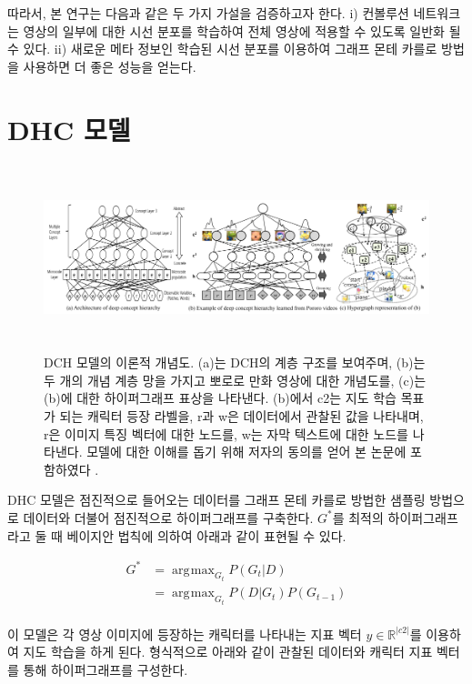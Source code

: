 \documentclass{kcc}
\DeclareMathOperator*{\argmax}{\arg\!\max}
\begin{document}
따라서, 본 연구는 다음과 같은 두 가지 가설을 검증하고자 한다. i) 컨볼루션 네트워크는 영상의 일부에 대한 시선 분포를 학습하여 전체 영상에 적용할 수 있도록 일반화 될 수 있다. ii) 새로운 메타 정보인 학습된 시선 분포를 이용하여 그래프 몬테 카를로 방법을 사용하면 더 좋은 성능을 얻는다.

\section{DHC 모델}

\begin{figure}
  \centerline{\includegraphics[width=180mm,height=54mm]{eps/ha2015_fig2.png}}
  \caption{DCH 모델의 이론적 개념도. (a)는 DCH의 계층 구조를 보여주며, (b)는 두 개의 개념 계층 망을 가지고 뽀로로 만화 영상에 대한 개념도를, (c)는 (b)에 대한 하이퍼그래프 표상을 나타낸다. (b)에서 c2는 지도 학습 목표가 되는 캐릭터 등장 라벨을, r과 w은 데이터에서 관찰된 값을 나타내며, r은 이미지 특징 벡터에 대한 노드를, w는 자막 텍스트에 대한 노드를 나타낸다. 모델에 대한 이해를 돕기 위해 저자의 동의를 얻어 본 논문에 포함하였다 \cite{Ha2015}.}
  \label{fig:ha2015}
\end{figure}

DHC 모델은 점진적으로 들어오는 데이터를 그래프 몬테 카를로 방법한 샘플링 방법으로 데이터와 더불어 점진적으로 하이퍼그래프를 구축한다. $G^{*}$를 최적의 하이퍼그래프라고 둘 때 베이지안 법칙에 의하여 아래과 같이 표현될 수 있다.

\begin{equation} \label{eq1}
\begin{split}
G^{*} & = \argmax_{G_{t}} P(G_{t}|D) \\
      & = \argmax_{G_{t}} P(D|G_{t})P(G_{t-1}) \\
\end{split}
\end{equation}

이 모델은 각 영상 이미지에 등장하는 캐릭터를 나타내는 지표 벡터 $y \in \mathds{R}^{|c2|}$를 이용하여 지도 학습을 하게 된다. 형식적으로 아래와 같이 관찰된 데이터와 캐릭터 지표 벡터를 통해 하이퍼그래프를 구성한다.
\end{document}
